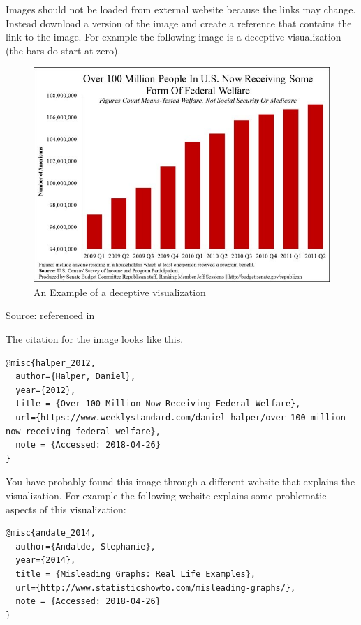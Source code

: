\documentclass[]{book}
\theoremstyle{definition}
\theoremstyle{definition}
\theoremstyle{definition}
\theoremstyle{remark}
\begin{document}
Images should not be loaded from external website because the links may
change. Instead download a version of the image and create a reference
that contains the link to the image. For example the following image is
a deceptive visualization (the bars do start at zero).

\begin{figure}
\centering
\includegraphics{images/halper_welfare.jpg}
\caption{An Example of a deceptive visualization}
\end{figure}

Source: \citep{halper_2012} referenced in \citep{andale_2014}

The citation for the image looks like this.

\begin{verbatim}
@misc{halper_2012,
  author={Halper, Daniel},
  year={2012},
  title = {Over 100 Million Now Receiving Federal Welfare},
  url={https://www.weeklystandard.com/daniel-halper/over-100-million-now-receiving-federal-welfare},
  note = {Accessed: 2018-04-26}
}
\end{verbatim}

You have probably found this image through a different website that
explains the visualization. For example the following website explains
some problematic aspects of this visualization:

\begin{verbatim}
@misc{andale_2014,
  author={Andalde, Stephanie},
  year={2014},
  title = {Misleading Graphs: Real Life Examples},
  url={http://www.statisticshowto.com/misleading-graphs/},
  note = {Accessed: 2018-04-26}
}
\end{verbatim}
\end{document}
